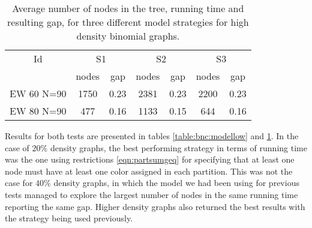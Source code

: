 \begin{table}[h]
\label{table:bnc:modelhigh}
\centering

\begin{tabular}{|c|cc|cc|cc|}
\hline
\multicolumn{1}{|c|}{Id} & \multicolumn{2}{|c|}{S1} & \multicolumn{2}{|c|}{S2} & \multicolumn{2}{|c|}{S3}
\\
 & nodes & gap & nodes & gap & nodes & gap
\\
\hline
EW 60 N=90 & 1750& 0.23 & 2381 & 0.23 & 2200 & 0.23
\\
EW 80 N=90 & 477 & 0.16 & 1133 & 0.15 & 644 &0.16
\\
\hline 
 \end{tabular}
 
 \caption{Average number of nodes in the tree, running time and resulting gap, for three different model strategies for high density binomial graphs.}

\end{table}

Results for both tests are presented in tables \ref{table:bnc:modellow} and \ref{table:bnc:modelhigh}. In the case of $20\%$ density graphs, the best performing strategy in terms of running time was the one using restrictions \ref{eqn:partsumgeq} for specifying that at least one node must have at least one color assigned in each partition. This was not the case for $40\%$ density graphs, in which the model we had been using for previous tests managed to explore the largest number of nodes in the same running time reporting the same gap. Higher density graphs also returned the best results with the strategy being used previously.